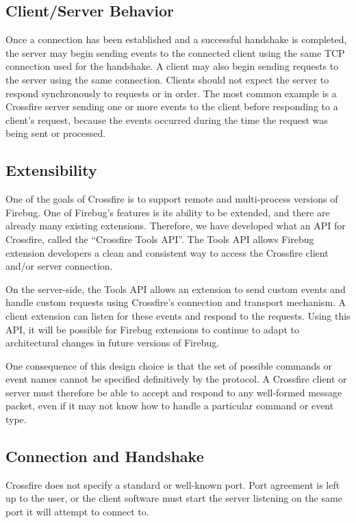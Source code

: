 \subsection {Client/Server Behavior}
Once a connection has been established and a successful handshake is completed,
the server may begin sending events to the connected client using the same TCP
connection used for the handshake. A client may also begin sending requests to
the server using the same connection. Clients should not expect the server to
respond synchronously to requests or in order. The most common example is a
Crossfire server sending one or more events to the client before responding to a
client's request, because the events occurred during the time the request was
being sent or processed.

\subsection {Extensibility}
One of the goals of Crossfire is to support remote and multi-process versions of
Firebug. One of Firebug's features is its ability to be extended, and there are
already many existing extensions. Therefore, we have developed what an API for
Crossfire, called the ``Crossfire Tools API''. The Tools API allows Firebug
extension developers a clean and consistent way to access the Crossfire client
and/or server connection.

On the server-side, the Tools API allows an extension to send custom events
and handle custom requests using Crossfire's connection and transport mechanism.
A client extension can listen for these events and respond to the requests.
Using this API, it will be possible for Firebug extensions to continue to adapt
to architectural changes in future versions of Firebug.

One consequence of this design choice is that the set of possible commands or
event names cannot be specified definitively by the protocol. A Crossfire
client or server must therefore be able to accept and respond to any well-formed
message packet, even if it may not know how to handle a particular command or
event type.

\subsection {Connection and Handshake}
Crossfire does not specify a standard or well-known port. Port agreement is left
up to the user, or the client software must start the server listening on
the same port it will attempt to connect to.

